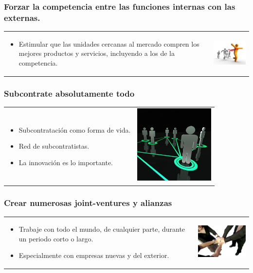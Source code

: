 {
\frametitle{Forzar la competencia entre las funciones internas con las
externas.}
\begin{table}
\begin{tabular}{p{7cm}p{3cm}}
\begin{itemize}
    \item Estimular que las unidades cercanas al mercado compren los mejores
    productos y servicios, incluyendo a los de la competencia.
\end{itemize}
&
\vspace{1.5cm}
\includegraphics[width=4cm]{img/competition.jpg}\\
\end{tabular}
\end{table}
}
\frame
{
\frametitle{Subcontrate absolutamente todo}
\begin{table}
\begin{tabular}{p{7cm}p{3cm}}
\begin{itemize}
    \item Subcontratación como forma de vida.
    \item Red de subcontratistas.
    \item La innovación es lo importante.
\end{itemize}
&
\vspace{1.5cm}
\includegraphics[width=4cm]{img/subcontract.jpg}\\
\end{tabular}
\end{table}
}
\frame
{
\frametitle{Crear numerosas joint-ventures y alianzas}
\begin{table}
\begin{tabular}{p{7cm}p{3cm}}
\begin{itemize}
    \item Trabaje con todo el mundo, de cualquier parte, durante un periodo
    corto o largo.
    \item Especialmente con empresas nuevas y del exterior.
\end{itemize}
&
\vspace{1.5cm}
\includegraphics[width=4cm]{img/joint-venture.jpg}\\
\end{tabular}
\end{table}
}
